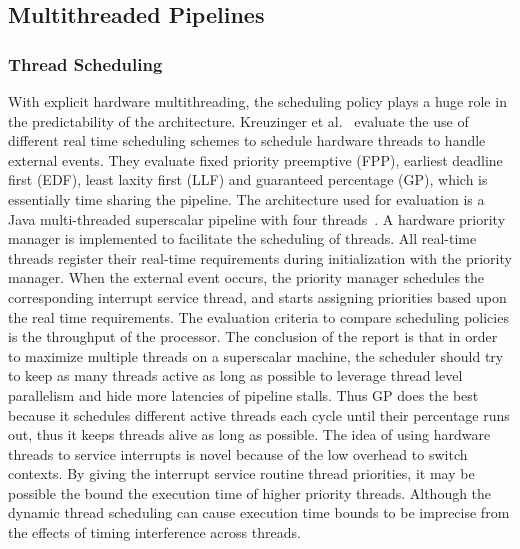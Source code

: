 \subsection{Multithreaded Pipelines}
\subsubsection{Thread Scheduling}
With explicit hardware multithreading, the scheduling policy plays a huge role in the predictability of the architecture.
Kreuzinger et al.~\cite{Kreuzinger2000RTmultithread} evaluate the use of different real time scheduling schemes to schedule hardware threads to handle external events. 
They evaluate fixed priority preemptive (FPP), earliest deadline first (EDF), least laxity first (LLF) and guaranteed percentage (GP), which is essentially time sharing the pipeline. 
The architecture used for evaluation is a Java multi-threaded superscalar pipeline with four threads~\cite{Kreuzinger2003multithreadeventhandle}. 
A hardware priority manager is implemented to facilitate the scheduling of threads. 
All real-time threads register their real-time requirements during initialization with the priority manager. 
When the external event occurs, the priority manager schedules the corresponding interrupt service thread, and starts assigning priorities based upon the real time requirements. 
The evaluation criteria to compare scheduling policies is the throughput of the processor. 
The conclusion of the report is that in order to maximize multiple threads on a superscalar machine, the scheduler should try to keep as many threads active as long as possible to leverage thread level parallelism and hide more latencies of pipeline stalls. 
Thus GP does the best because it schedules different active threads each cycle until their percentage runs out, thus it keeps threads alive as long as possible. 
The idea of using hardware threads to service interrupts is novel because of the low overhead to switch contexts. 
By giving the interrupt service routine thread priorities, it may be possible the bound the execution time of higher priority threads. 
Although the dynamic thread scheduling can cause execution time bounds to be imprecise from the effects of timing interference across threads.  
  
